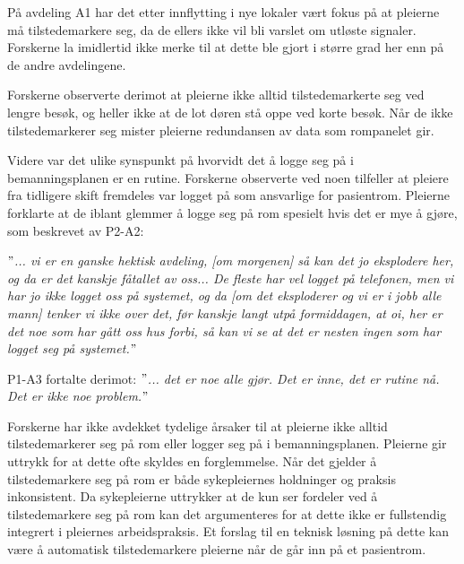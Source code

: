 \noindent
På avdeling A1 har det etter innflytting i nye lokaler vært fokus på at pleierne må tilstedemarkere seg, da de ellers ikke vil bli varslet om utløste signaler. Forskerne la imidlertid ikke merke til at dette ble gjort i større grad her enn på de andre avdelingene. 

\noindent
Forskerne observerte derimot at pleierne ikke alltid tilstedemarkerte seg ved lengre besøk, og heller ikke at de lot døren stå oppe ved korte besøk. Når de ikke tilstedemarkerer seg mister pleierne redundansen av data som rompanelet gir. 

\noindent
Videre var det ulike synspunkt på hvorvidt det å logge seg på i bemanningsplanen er en rutine. Forskerne observerte ved noen tilfeller at pleiere fra tidligere skift fremdeles var logget på som ansvarlige for pasientrom. Pleierne forklarte at de iblant glemmer å logge seg på rom spesielt hvis det er mye å gjøre, som beskrevet av P2-A2:

\noindent
\textit{$"$... vi er en ganske hektisk avdeling, [om morgenen] så kan det jo eksplodere her, og da er det kanskje fåtallet av oss... De fleste har vel logget på telefonen, men vi har jo ikke logget oss på systemet, og da [om det eksploderer og vi er i jobb alle mann] tenker vi ikke over det, før kanskje langt utpå formiddagen, at oi, her er det noe som har gått oss hus forbi, så kan vi se at det er nesten ingen som har logget seg på systemet.$"$}

\noindent
P1-A3 fortalte derimot: \textit{$"$... det er noe alle gjør. Det er inne, det er rutine nå. Det er ikke noe problem.$"$} 

\noindent
Forskerne har ikke avdekket tydelige årsaker til at pleierne ikke alltid tilstedemarkerer seg på rom eller logger seg på i bemanningsplanen. Pleierne gir uttrykk for at dette ofte skyldes en forglemmelse. Når det gjelder å tilstedemarkere seg på rom er både sykepleiernes holdninger og praksis inkonsistent. Da sykepleierne uttrykker at de kun ser fordeler ved å tilstedemarkere seg på rom kan det argumenteres for at dette ikke er fullstendig integrert i pleiernes arbeidspraksis. Et forslag til en teknisk løsning på dette kan være å automatisk tilstedemarkere pleierne når de går inn på et pasientrom. 

